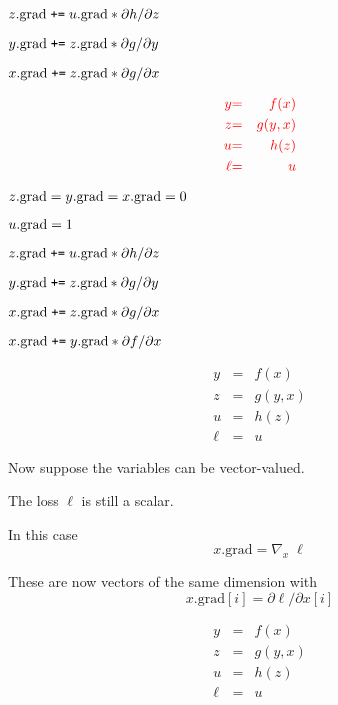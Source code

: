 {\medskip
$z.\mathrm{grad}\;\mbox{\tt +=}\; u.\mathrm{grad} * {\partial h}/{\partial z}$

\medskip
$y.\mathrm{grad} \;\mbox{\tt +=}\; z.\mathrm{grad} * {\partial g}/{\partial y}$

\medskip
$x.\mathrm{grad} \;\mbox{\tt +=}\; z.\mathrm{grad} * {\partial g}/{\partial x}$

\vspace{-3ex}
\begin{eqnarray*}
  {\color{red} y} & {\color{red} =} & {\color{red} f(x)} \\
  {\color{red} z} & {\color{red} =} & {\color{red} g(y,x)} \\
  {\color{red} u} & {\color{red} =} & {\color{red} h(z)} \\
  {\color{red} \ell} & {\color{red} =} & {\color{red} u}
\end{eqnarray*}

\medskip
$z.\mathrm{grad} = y.\mathrm{grad} = x.\mathrm{grad} = 0$

\medskip
$u.\mathrm{grad} = 1$

\medskip
$z.\mathrm{grad}\;\mbox{\tt +=}\; u.\mathrm{grad} * {\partial h}/{\partial z}$

\medskip
$y.\mathrm{grad} \;\mbox{\tt +=}\; z.\mathrm{grad} * {\partial g}/{\partial y}$

\medskip
$x.\mathrm{grad} \;\mbox{\tt +=}\; z.\mathrm{grad} * {\partial g}/{\partial x}$

\medskip
$x.\mathrm{grad} \;\mbox{\tt +=}\; y.\mathrm{grad} * {\partial f}/{\partial x}$

\vspace{-3ex}
\begin{eqnarray*}
  y & = & f(x) \\
  z & = & g(y,x) \\
  u & = & h(z) \\
  \ell & = & u
\end{eqnarray*}

\vfill
Now suppose the variables can be  vector-valued.

\vfill
The loss $\ell$ is still a scalar.

\vfill
In this case
$$x.\mathrm{grad} = \nabla_x\;\ell$$

\vfill
These are now vectors of the same dimension with
$$x.\mathrm{grad}[i] = \partial \ell/\partial x[i]$$


\begin{eqnarray*}
  y & = & f(x) \\
  z & = & g(y,x) \\
  u & = & h(z) \\
  \ell & = & u
\end{eqnarray*}

}
